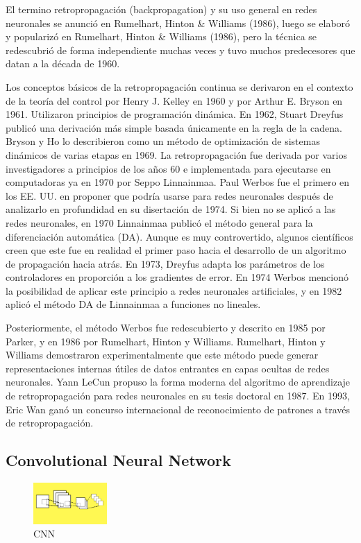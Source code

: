 \documentclass[a4paper]{article}
\begin{document}
El termino retropropagación (backpropagation) y su uso general en 
redes neuronales se anunció en Rumelhart, Hinton \& Williams 
(1986), luego se elaboró y popularizó en Rumelhart, 
Hinton \& Williams (1986), pero la técnica se redescubrió de forma 
independiente muchas veces y tuvo muchos predecesores que datan a 
la década de 1960.

Los conceptos básicos de la retropropagación continua se derivaron 
en el contexto de la teoría del control por Henry J. Kelley en 
1960 y por Arthur E. Bryson en 1961. Utilizaron principios de 
programación dinámica. En 1962, Stuart Dreyfus publicó una 
derivación más simple basada únicamente en la regla de la cadena. 
Bryson y Ho lo describieron como un método de optimización de 
sistemas dinámicos de varias etapas en 1969. La retropropagación 
fue derivada por varios investigadores a principios de los años 60 
e implementada para ejecutarse en computadoras ya en 1970 por 
Seppo Linnainmaa. Paul Werbos fue el primero en los EE. UU. en 
proponer que podría usarse para redes neuronales después de 
analizarlo en profundidad en su disertación de 1974. Si bien no se 
aplicó a las redes neuronales, en 1970 Linnainmaa publicó el 
método general para la diferenciación automática (DA). Aunque es 
muy controvertido, algunos científicos creen que este fue en 
realidad el primer paso hacia el desarrollo de un algoritmo de 
propagación hacia atrás. En 1973, Dreyfus adapta los parámetros de 
los controladores en proporción a los gradientes de error. En 1974 
Werbos mencionó la posibilidad de aplicar este principio a redes 
neuronales artificiales, y en 1982 aplicó el método DA de 
Linnainmaa a funciones no lineales.

Posteriormente, el método Werbos fue redescubierto y descrito en 
1985 por Parker, y en 1986 por Rumelhart, Hinton y Williams. 
Rumelhart, Hinton y Williams demostraron experimentalmente que 
este método puede generar representaciones internas útiles de 
datos entrantes en capas ocultas de redes neuronales. Yann LeCun 
propuso la forma moderna del algoritmo de aprendizaje de 
retropropagación para redes neuronales en su tesis doctoral en 
1987. En 1993, Eric Wan ganó un concurso internacional de 
reconocimiento de patrones a través de retropropagación.

\subsection{Convolutional Neural Network}
\begin{figure} %
    \centering
    \includegraphics[width=0.25\textwidth]{./images/net_convolutional.png}
    \caption{CNN}
\end{figure}
\end{document}
